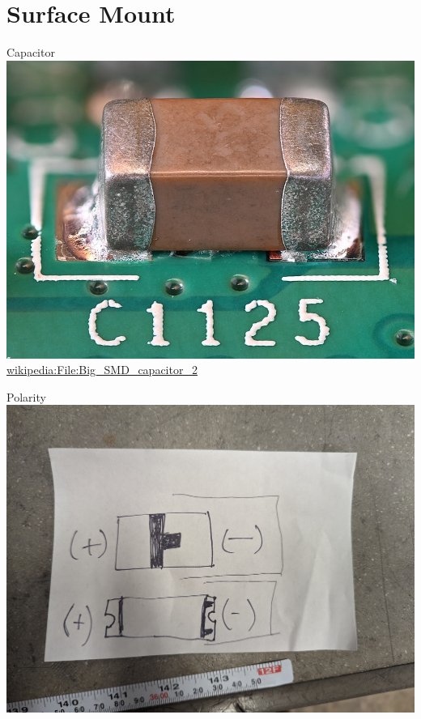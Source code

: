 \documentclass{presentation}
\begin{document}
\section{Surface Mount}

\begin{frame}{Capacitor}
  \centering
  \includegraphics[width=\textwidth*3/4]{./Big_SMD_capacitor_2.jpg} \\
  \url{wikipedia:File:Big_SMD_capacitor_2}
\end{frame}

\begin{frame}{Polarity}
  \centering
  \includegraphics[width=\textwidth*3/4]{./polarity.jpg} \\
\end{frame}
\end{document}
